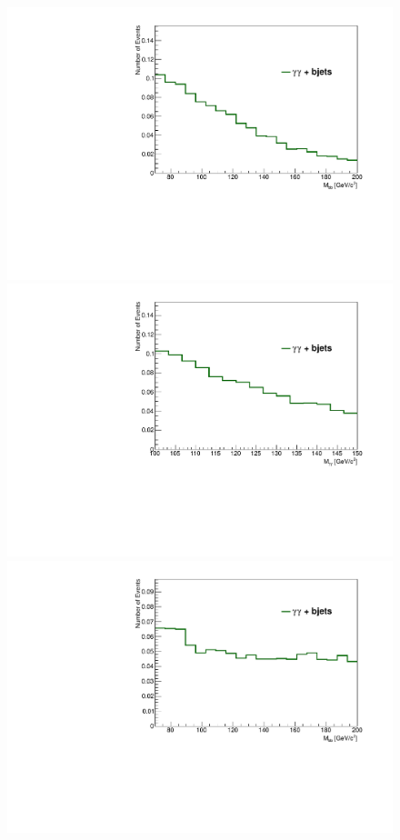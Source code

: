 \documentclass{cmspaper}
\begin{document}
\begin{figure}[h]
\includegraphics[scale=0.35, angle=0]{figures/MassBB_s1.pdf}	
\includegraphics[scale=0.35, angle=0]{figures/MassGG_s1.pdf}	
\includegraphics[scale=0.35, angle=0]{figures/MassBB_s2.pdf}	

\end{figure}
\end{document}

